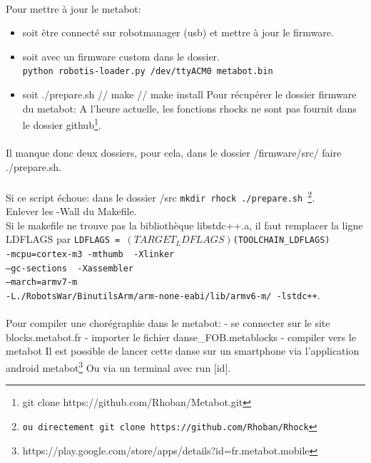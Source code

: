 \documentclass[10pt,a4paper]{report}
\begin{document}
\begin{appendices}
\paragraph{}
Pour mettre à jour le metabot:
\begin{itemize}
\item soit être connecté sur robotmanager (usb) et mettre à jour le firmware.
\item soit avec un firmware custom dans le dossier.\\
    \texttt{python robotis-loader.py /dev/ttyACM0 metabot.bin}
\item soit ./prepare.sh // make // make install
Pour récupérer le dossier firmware du metabot:
A l'heure actuelle, les fonctions rhocks ne sont pas fournit dans le dossier github\footnote{git clone https://github.com/Rhoban/Metabot.git}.
\end{itemize}

\paragraph{}
Il manque donc deux dossiers, pour cela, dans le dossier /firmware/src/ faire ./prepare.sh.
\paragraph{}
Si ce script échoue: dans le dossier /src \texttt{mkdir rhock ./prepare.sh \footnote{ou directement git clone https://github.com/Rhoban/Rhock}}. \\
Enlever les -Wall du Makefile.\\
Si le makefile ne trouve pas la bibliothèque libstdc++.a, il faut remplacer la ligne LDFLAGS par  
\texttt{LDFLAGS = $(TARGET_LDFLAGS) $(TOOLCHAIN\_LDFLAGS)\\ 
-mcpu=cortex-m3 -mthumb \ -Xlinker\\ 
--gc-sections \ -Xassembler\\
--march=armv7-m \ \\
-L./RobotsWar/BinutilsArm/arm-none-eabi/lib/armv6-m/ -lstdc++}.
\paragraph{}
Pour compiler une chorégraphie dans le metabot:
- se connecter sur le site blocks.metabot.fr
- importer le fichier danse\_FOB.metablocks
- compiler vers le metabot
Il est possible de lancer cette danse sur un smartphone via l'application android metabot\footnote{https://play.google.com/store/apps/details?id=fr.metabot.mobile} Ou via un terminal avec run [id].

\end{appendices}
\end{document}
